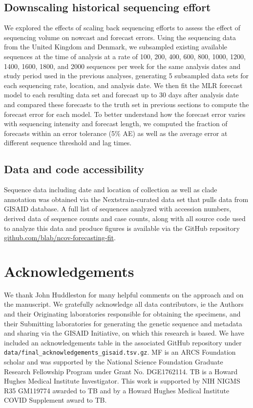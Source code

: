 \documentclass[11pt,oneside,letterpaper]{article}
\begin{document}
\subsection*{Downscaling historical sequencing effort}

We explored the effects of scaling back sequencing efforts to assess the effect of sequencing volume on nowcast and forecast errors.
Using the sequencing data from the United Kingdom and Denmark, we subsampled existing available sequences at the time of analysis at a rate of 100, 200, 400, 600, 800, 1000, 1200, 1400, 1600, 1800, and 2000 sequences per week for the same analysis dates and study period used in the previous analyses, generating 5 subsampled data sets for each sequencing rate, location, and analysis date.
We then fit the MLR forecast model to each resulting data set and forecast up to 30 days after analysis date and compared these forecasts to the truth set in previous sections to compute the forecast error for each model.
To better understand how the forecast error varies with sequencing intensity and forecast length, we computed the fraction of forecasts within an error tolerance (5\% AE) as well as the average error at different sequence threshold and lag times.

\subsection*{Data and code accessibility}

Sequence data including date and location of collection as well as clade annotation was obtained via the Nextstrain-curated data set that pulls data from GISAID database.
A full list of sequences analyzed with accession numbers, derived data of sequence counts and case counts, along with all source code used to analyze this data and produce figures is available via the GitHub repository \href{https://github.com/blab/ncov-forecasting-fit}{github.com/blab/ncov-forecasting-fit}.

\section*{Acknowledgements}

We thank John Huddleston for many helpful comments on the approach and on the manuscript.
We gratefully acknowledge all data contributors, ie the Authors and their Originating laboratories responsible for obtaining the specimens, and their Submitting laboratories for generating the genetic sequence and metadata and sharing via the GISAID Initiative, on which this research is based.
We have included an acknowledgements table in the associated GitHub repository under \texttt{data/final\_acknowledgements\_gisaid.tsv.gz}.
MF is an ARCS Foundation scholar and was supported by the National Science Foundation Graduate Research Fellowship Program under Grant No. DGE1762114.
TB is a Howard Hughes Medical Institute Investigator.
This work is supported by NIH NIGMS R35 GM119774 awarded to TB and by a Howard Hughes Medical Institute COVID Supplement award to TB.
\end{document}
